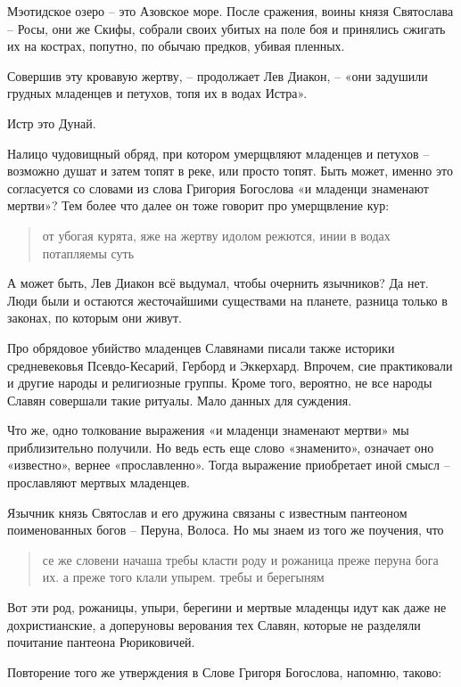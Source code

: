 \documentclass[a5paper,11pt,openany]{article}
\begin{document}
Мэотидское озеро – это Азовское море. После сражения, воины князя Святослава – Росы, они же Скифы, собрали своих убитых на поле боя и принялись сжигать их на кострах, попутно, по обычаю предков, убивая пленных.

Совершив эту кровавую жертву, – продолжает Лев Диакон, – «они задушили грудных младенцев и петухов, топя их в водах Истра». 

Истр это Дунай.

Налицо чудовищный обряд, при котором умерщвляют младенцев и петухов – возможно душат и затем топят в реке, или просто топят. Быть может, именно это согласуется со словами из слова Григория Богослова «и младенци знаменают мертви»? Тем более что далее он тоже говорит про умерщвление кур:

\begin{quotation}
\noindent от убогая курята, яже на жертву идолом режются, инии в водах потапляемы суть\end{quotation}

   А может быть, Лев Диакон всё выдумал, чтобы очернить язычников? Да нет. Люди были и остаются жесточайшими существами на планете, разница только в законах, по которым они живут.

   Про обрядовое убийство младенцев Славянами писали также историки средневековья Псевдо-Кесарий, Герборд и Эккерхард. Впрочем, сие практиковали и другие народы и религиозные группы. Кроме того, вероятно, не все народы Славян совершали такие ритуалы. Мало данных для суждения.

   Что же, одно толкование выражения «и младенци знаменают мертви» мы приблизительно получили. Но ведь есть еще слово «знаменито», означает оно «известно», вернее «прославленно». Тогда выражение приобретает иной смысл – прославляют мертвых младенцев.

   Язычник князь Святослав и его дружина связаны с известным пантеоном поименованных богов – Перуна, Волоса. Но мы знаем из того же поучения, что 

\begin{quotation}
\noindent се же словени начаша требы класти роду и рожаница преже перуна бога их. а преже того клали упырем. требы и берегыням
\end{quotation}

Вот эти род, рожаницы, упыри, берегини и мертвые младенцы идут как даже не дохристианские, а доперуновы верования тех Славян, которые не разделяли почитание пантеона Рюриковичей.

   Повторение того же утверждения в Слове Григоря Богослова, напомню, таково:
\end{document}
